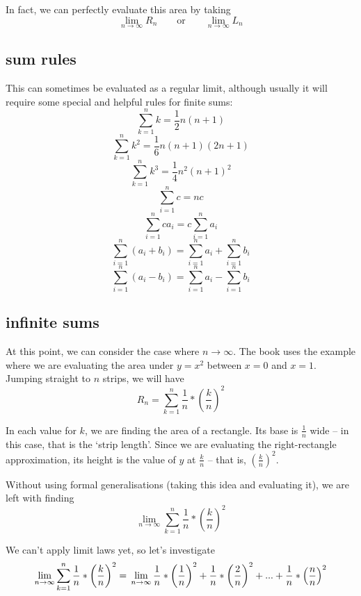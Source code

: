 \documentclass[10pt,a4paper]{report}
\begin{document}
In fact, we can perfectly evaluate this area by taking
$$
	\lim_{n \to \infty} R_n \qquad \text{or} \qquad \lim_{n \to \infty} L_n
$$

\subsection{sum rules}

This can sometimes be evaluated as a regular limit, although usually it will require some special and helpful rules for finite sums:
$$
	\displaystyle\sum_{k = 1}^{n} k = \frac{1}{2} n (n + 1)
$$
$$
	\displaystyle\sum_{k = 1}^{n} k^2 = \frac{1}{6} n(n+1)(2n+1)
$$
$$
	\displaystyle\sum_{k = 1}^{n} k^3 = \frac{1}{4} n^2(n+1)^2
$$
$$
	\displaystyle\sum_{i = 1}^{n} c = nc
$$
$$
	\displaystyle\sum_{i = 1}^{n} ca_i = c \displaystyle\sum_{i = 1}^{n} a_i
$$
$$
	\displaystyle\sum_{i = 1}^{n} (a_i + b_i) = \displaystyle\sum_{i = 1}^{n} a_i + \displaystyle\sum_{i = 1}^{n} b_i
$$
$$
	\displaystyle\sum_{i = 1}^{n} (a_i - b_i) = \displaystyle\sum_{i = 1}^{n} a_i - \displaystyle\sum_{i = 1}^{n} b_i
$$

\subsection{infinite sums}

At this point, we can consider the case where $n \to \infty$. The book uses the example where we are evaluating the area under $y = x^2$ between $x = 0$ and $x = 1$. Jumping straight to $n$ strips, we will have
$$
	R_n = \displaystyle\sum_{k = 1}^{n} \frac{1}{n} * \left(\frac{k}{n} \right)^2
$$

In each value for $k$, we are finding the area of a rectangle. Its base is $\frac{1}{n}$ wide -- in this case, that is the `strip length'. Since we are evaluating the right-rectangle approximation, its height is the value of $y$ at $\frac{k}{n}$ -- that is, $\left( \frac{k}{n} \right)^2$.

Without using formal generalisations (taking this idea and evaluating it), we are left with finding
$$
	\lim_{n \to \infty} \displaystyle\sum_{k = 1}^{n} \frac{1}{n} * \left(\frac{k}{n} \right)^2
$$

We can't apply limit laws yet, so let's investigate
$$
	\lim_{n \to \infty} \displaystyle\sum_{k = 1}^{n} \frac{1}{n} * \left(\frac{k}{n} \right)^2 = \\
	\lim_{n \to \infty} \frac{1}{n} * \left(\frac{1}{n} \right)^2 + \frac{1}{n} * \left(\frac{2}{n} \right)^2 + ... + \\
	\frac{1}{n} * \left(\frac{n}{n} \right)^2
$$
\end{document}
